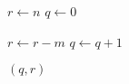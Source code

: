 
\begin{algorithm}[H]
  \begin{algorithmic}[1]
      \State {}
      \State $r \gets n$
      \State $q \gets 0$
      
      \hStatex
      \State {}
      \State {}
        \State $r \gets r - m$
        \State $q \gets q + 1$
      \EndWhile
      \State {}
      
      \hStatex
      \State \Return $(q, r)$
    \EndProcedure
  \end{algorithmic}
\end{algorithm}